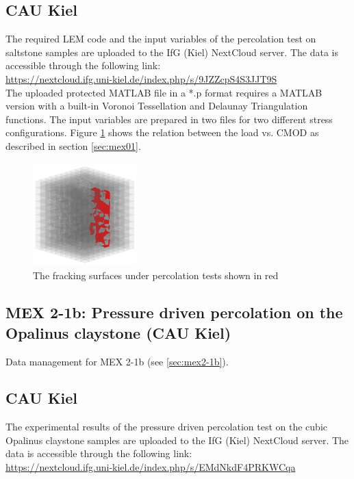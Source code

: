 \subsection*{CAU Kiel}

The required LEM code and the input variables of the percolation test on saltstone samples are uploaded to the IfG (Kiel) NextCloud server. The data is accessible through the following link:\\
\hyperlink{https://nextcloud.ifg.uni-kiel.de/index.php/s/9JZZcpS4S3JJT9S}{https://nextcloud.ifg.uni-kiel.de/index.php/s/9JZZcpS4S3JJT9S}\\

The uploaded protected MATLAB file in a *.p format requires a MATLAB version with a built-in Voronoi Tessellation and Delaunay Triangulation functions. The input variables are prepared in two files for two different stress configurations. Figure \ref{fig:Amir_ME2_LEM_b_model_Fracture_Data} shows the relation between the load vs. CMOD as described in section \ref {sec:mex01}.

\begin{figure}[!ht]
\centering
\includegraphics[width=4cm,height=4cm]{figures/Amir_ME2_LEM_b_model_Fracture_Data.png}
\caption{The fracking surfaces under percolation tests shown in red}
\label{fig:Amir_ME2_LEM_b_model_Fracture_Data}
\end{figure}

\subsection{MEX 2-1b: Pressure driven percolation on the Opalinus claystone (CAU Kiel)}

Data management for MEX 2-1b (see \ref{sec:mex2-1b}).

\subsection*{CAU Kiel}

The experimental results of the pressure driven percolation test on the cubic Opalinus claystone samples are uploaded to the IfG (Kiel) NextCloud server. The data is accessible through the following link:\\
\hyperlink{https://nextcloud.ifg.uni-kiel.de/index.php/s/EMdNkdF4PRKWCqa}{https://nextcloud.ifg.uni-kiel.de/index.php/s/EMdNkdF4PRKWCqa}\\

